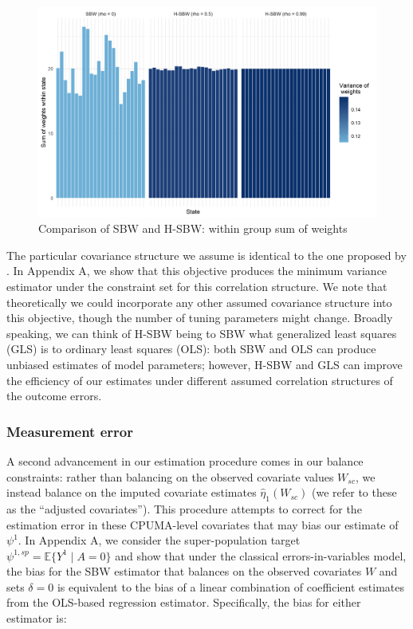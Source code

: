 \begin{figure}
\begin{center}
    \includegraphics[scale=0.5]{01_Plots/proofofconcept.png}
    \caption{Comparison of SBW and H-SBW: within group sum of weights}
    \label{oatepref}
\end{center}
\end{figure}

The particular covariance structure we assume is identical to the one proposed by \cite{kloek1981ols}. In Appendix A, we show that this objective produces the minimum variance estimator under the constraint set for this correlation structure. We note that theoretically we could incorporate any other assumed covariance structure into this objective, though the number of tuning parameters might change. Broadly speaking, we can think of H-SBW being to SBW what generalized least squares (GLS) is to ordinary least squares (OLS): both SBW and OLS can produce unbiased estimates of model parameters; however, H-SBW and GLS can improve the efficiency of our estimates under different assumed correlation structures of the outcome errors.

\subsubsection{Measurement error}

A second advancement in our estimation procedure comes in our balance constraints: rather than balancing on the observed covariate values $W_{sc}$, we instead balance on the imputed covariate estimates $\hat{\eta}_1(W_{sc})$ (we refer to these as the ``adjusted covariates''). This procedure attempts to correct for the estimation error in these CPUMA-level covariates that may bias our estimate of $\psi^1$. In Appendix A, we consider the super-population target $\psi^{1, sp} = \mathbb{E}\{Y^1 \mid A = 0\}$ and show that under the classical errors-in-variables model, the bias for the SBW estimator that balances on the observed covariates $W$ and sets $\delta = 0$ is equivalent to the bias of a linear combination of coefficient estimates from the OLS-based regression estimator. Specifically, the bias for either estimator is:


